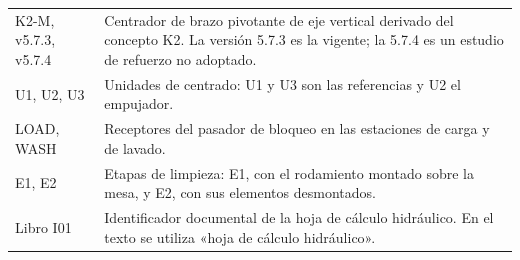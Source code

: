 \begin{longtable}{@{}>{\raggedright\arraybackslash}p{3.6cm}>{\raggedright\arraybackslash}p{\dimexpr(\textwidth-3.6cm-2\tabcolsep)/1\relax}@{}}
K2-M, v5.7.3, v5.7.4 & Centrador de brazo pivotante de eje vertical derivado del concepto K2. La versión 5.7.3 es la vigente; la 5.7.4 es un estudio de refuerzo no adoptado.\\
U1, U2, U3 & Unidades de centrado: U1 y U3 son las referencias y U2 el empujador.\\
LOAD, WASH & Receptores del pasador de bloqueo en las estaciones de carga y de lavado.\\
E1, E2 & Etapas de limpieza: E1, con el rodamiento montado sobre la mesa, y E2, con sus elementos desmontados.\\
Libro I01 & Identificador documental de la hoja de cálculo hidráulico. En el texto se utiliza «hoja de cálculo hidráulico».\\
\end{longtable}

\endgroup